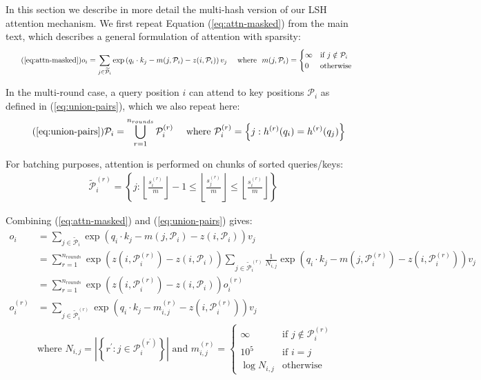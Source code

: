 \documentclass{article} \usepackage{iclr2020_conference,times}
\def\pair{\mathcal{P}}
\def\extpair{\widetilde{\mathcal{P}}}
\begin{document}
In this section we describe in more detail the multi-hash version of our LSH attention mechanism. We first repeat Equation (\ref{eq:attn-masked}) from the main text, which describes a general formulation of attention with sparsity:
\begin{equation*} \tag{\ref{eq:attn-masked}}
    o_i = \sum_{j \in \extpair_i} \exp \left(q_i \cdot k_j - m(j, \pair_i) - z(i, \pair_i) \right) v_j \quad
    \text{ where } \ m(j, \pair_i) = \begin{cases}
    \infty & \text{if } j \notin \pair_i\\
    0 & \text{otherwise}
    \end{cases}
\end{equation*}

In the multi-round case, a query position $i$ can attend to key positions $\pair_i$ as defined in (\ref{eq:union-pairs}), which we also repeat here:
\begin{align*} \tag{\ref{eq:union-pairs}}
    &\pair_i = \bigcup_{r=1}^{n_{rounds}} \pair^{(r)}_i
    & \text{ where } \pair^{(r)}_i = \left\{ j : h^{(r)}(q_i) = h^{(r)}(q_j) \right\}
\end{align*}

For batching purposes, attention is performed on chunks of sorted queries/keys:
\begin{align}
    &\extpair^{(r)}_i = \left\{ j : \left\lfloor \frac{s^{(r)}_i}{m}\right\rfloor - 1 \leq \left\lfloor \frac{s^{(r)}_j}{m}\right\rfloor \leq  \left\lfloor \frac{s^{(r)}_i}{m}\right\rfloor \right\}
\end{align}

Combining (\ref{eq:attn-masked}) and (\ref{eq:union-pairs}) gives:
\begin{align}
    o_i &= \sum_{j \in \extpair_i} \exp \left(q_i \cdot k_j - m(j, \pair_i) - z(i, \pair_i) \right) v_j \\
    &= \sum_{r=1}^{n_{rounds}} \exp \left(z(i, \pair^{(r)}_i) - z(i, \pair_i)\right) \sum_{j \in \extpair^{(r)}_i} \frac{1}{N_{i,j}}\exp\left(q_i \cdot k_j - m(j, \pair^{(r)}_i) - z(i, \pair^{(r)}_i)\right) v_j \\
&= \sum_{r=1}^{n_{rounds}} \exp \left(z(i, \pair^{(r)}_i) - z(i, \pair_i)\right) o^{(r)}_i\\
    o^{(r)}_i &=\sum_{j \in \extpair^{(r)}_i} \exp\left(q_i \cdot k_j - m^{(r)}_{i,j} - z(i, \pair^{(r)}_i)\right) v_j \\
    &\text{where } N_{i,j} = \left|\left\{r^\prime : j \in \pair^{(r^\prime)}_i\right\}\right|
    \text{ and } m^{(r)}_{i, j} = \begin{cases}
    \infty & \text{if } j \notin \pair^{(r)}_i\\
    10^5  & \text{if } i = j\\
    \log N_{i,j} & \text{otherwise}
    \end{cases}
\end{align}
\end{document}
